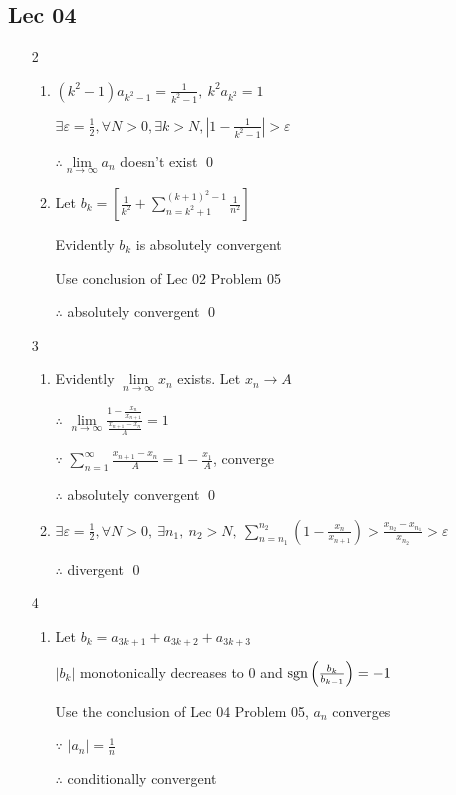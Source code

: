 \subsection{Lec 04}
 \begin{enumerate}[1]
   \item[2]
   \begin{enumerate}[(1)]
     \item
     $(k^2-1)a_{k^2-1}=\frac{1}{k^2-1},\ k^2a_{k^2}=1$
     \par $\exists \varepsilon =\frac{1}{2}, \forall N>0, \exists k>N, \left|1-\frac{1}{k^2-1}\right|>\varepsilon$
     \par $\therefore \lim\limits_{n\rightarrow\infty}a_n$ doesn't exist \qed
     \item
     Let $b_k=\left[\frac{1}{k^2}+\sum\limits_{n=k^2+1}^{(k+1)^2-1}\frac{1}{n^2}\right]$
     \par Evidently $b_k$ is absolutely convergent
     \par Use conclusion of Lec 02 Problem 05
     \par $\therefore$ absolutely convergent \qed
   \end{enumerate}

   \item[3]
   \begin{enumerate}[(1)]
     \item
     Evidently $\lim\limits_{n\rightarrow\infty}x_n$ exists. Let $x_n\rightarrow A$
     \par $\therefore$ $\lim\limits_{n\rightarrow{\infty}}\frac{1-\frac{x_n}{x_{n+1}}}{\frac{x_{n+1}-x_n}{A}}=1$
     \par $\because$ $\sum\limits_{n=1}^\infty\frac{x_{n+1}-x_n}{A}=1-\frac{x_1}{A}$, converge
     \par $\therefore$ absolutely convergent \qed

     \item
     $\exists \varepsilon=\frac{1}{2}, \forall N>0,\  \exists n_1,\ n_2>N,\  \sum\limits_{n=n_1}^{n_2}(1-\frac{x_n}{x_{n+1}})>\frac{x_{n_2}-x_{n_1}}{x_{n_2}}>\varepsilon$
     \par $\therefore$ divergent \qed
   \end{enumerate}

   \item[4]
   \begin{enumerate}[(1)]
     \item
     Let $b_k=a_{3k+1}+a_{3k+2}+a_{3k+3}$
     \par $\left|b_k\right|$ monotonically decreases to $0$ and $\mathop{\mathrm{sgn}} \left(\frac{b_k}{b_{k-1}}\right)=-1$
     \par Use the conclusion of Lec 04 Problem 05, $a_n$ converges
     \par $\because$ $\left|a_n\right|=\frac{1}{n}$
     \par $\therefore$ conditionally convergent


\end{enumerate}
\end{enumerate}
